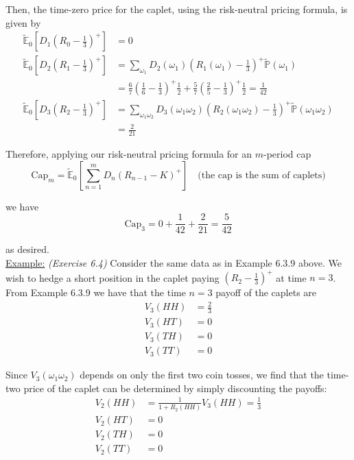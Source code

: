 \documentclass[12pt]{article}
\newlength\tindent
\renewcommand{\indent}{\hspace*{\tindent}}
\renewcommand{\P}{\mathbb P}
\newcommand{\E}{\mathbb E}
\begin{document}
Then, the time-zero price for the caplet, using the risk-neutral pricing formula, is given by
\begin{align*}
	\tilde{\E}_0 \left[ D_1 \left(R_0 - \frac{1}{3}\right)^+ \right] &= 0 \\
	\tilde{\E}_0 \left[ D_2 \left(R_1 - \frac{1}{3}\right)^+ \right] &= \sum_{\omega_1} D_2(\omega_1) \left(R_1(\omega_1) - \frac{1}{3}\right)^+ \tilde{\P}(\omega_1) \\
	&= \frac{6}{7}\left( \frac{1}{6} - \frac{1}{3}\right)^+\frac{1}{2} + \frac{5}{7}\left( \frac{2}{5} - \frac{1}{3}\right)^+ \frac{1}{2} = \frac{1}{42} \\
	\tilde{\E}_0 \left[ D_3 \left(R_2 - \frac{1}{3}\right)^+ \right] &= \sum_{\omega_1\omega_2} D_3(\omega_1\omega_2) \left( R_2(\omega_1\omega_2) - \frac{1}{3} \right)^+ \tilde{\P}(\omega_1\omega_2) \\
	&= \frac{2}{21}
\end{align*}

Therefore, applying our risk-neutral pricing formula for an $m$-period cap
\begin{equation*}
	\text{Cap}_m = \tilde{\E}_0 \left[ \sum^m_{n = 1} D_n \left(R_{n - 1} - K\right)^+ \right] \quad \text{(the cap is the sum of caplets)}
\end{equation*}

we have
\begin{equation*}
	\text{Cap}_3 = 0 + \frac{1}{42} + \frac{2}{21} = \frac{5}{42}
\end{equation*}

as desired. \\

\underline{Example:} {\em (Exercise 6.4)} Consider the same data as in Example 6.3.9 above. We wish to hedge a short position in the caplet paying $\left( R_2 - \frac{1}{3} \right)^+$ at time $n = 3$. From Example 6.3.9 we have that the time $n = 3$ payoff of the caplets are
\begin{align*}
	V_3(HH) &= \frac{2}{3} \\
	V_3(HT) &= 0 \\
	V_3(TH) &= 0 \\
	V_3(TT) &= 0
\end{align*}

\indent Since $V_3(\omega_1\omega_2)$ depends on only the first two coin tosses, we find that the time-two price of the caplet can be determined by simply discounting the payoffs:
\begin{align*}
	V_2(HH) &= \frac{1}{1 + R_2(HH)}V_3(HH) = \frac{1}{3} \\
	V_2(HT) &= 0 \\
	V_2(TH) &= 0 \\
	V_2(TT) &= 0
\end{align*}
\end{document}
